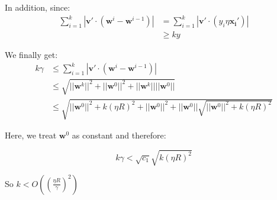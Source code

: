 \documentclass{article}
\newcommand{\V}[1]{\boldsymbol{#1}}
\begin{document}
In addition, since:
\begin{equation}
\begin{aligned}
\sum_{i=1}^k|\V{v'}\cdot (\V{w}^i-\V{w}^{i-1})|&=\sum_{i=1}^k|\V{v'}\cdot (y_i\eta\V{x_i}')|\\
&\geq ky
\end{aligned}
\end{equation}

We finally get:
\begin{equation}
\begin{aligned}
k\gamma &\leq \sum_{i=1}^k|\V{v'}\cdot (\V{w}^i-\V{w}^{i-1})|\\
&\leq \sqrt{||\V{w}^k||^2+||\V{w}^0||^2+||\V{w}^k||||\V{w}^0||}\\
&\leq\sqrt{||\V{w}^0||^2+k(\eta R)^2+||\V{w}^0||^2+||\V{w}^0||\sqrt{||\V{w}^0||^2+k(\eta R)^2}}
\end{aligned}
\end{equation}

Here, we treat \(\V{w}^0\) as constant and therefore:

\begin{equation}
k\gamma < \sqrt{c_1}\sqrt{k(\eta R)^2}
\end{equation}

So \(k<O((\frac{\eta R}{\gamma})^2)\)
\end{document}
